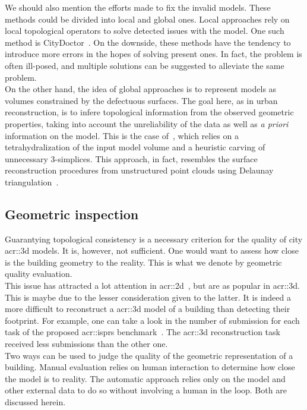         We should also mention the efforts made to fix the invalid models. 
        These methods could be divided into local and global ones.
        Local approaches rely on local topological operators to solve detected issues with the model.
        One such method is CityDoctor~\parencite{alam2014towards}.
        On the downside, these methods have the tendency to introduce more errors in the hopes of solving present ones.
        In fact, the problem is often ill-posed, and multiple solutions can be suggested to alleviate the same problem.\\
        On the other hand, the idea of global approaches is to represent models as volumes constrained by the defectuous surfaces.
        The goal here, as in urban reconstruction, is to infere topological information from the observed geometric properties, taking into account the unreliability of the data as well as \textit{a priori} information on the model.
        This is the case of~\textcite{zhao2013automatic}, which relies on a tetrahydralization of the input model volume and a heuristic carving of unnecessary 3-simplices.
        This approach, in fact, resembles the surface reconstruction procedures from unstructured point clouds using Delaunay triangulation~\parencite{cazals2006delaunay, berger2014state}.

    \subsection{Geometric inspection}
        \label{sec::introduction::building_model_evaluation::geometric}
        Guarantying topological consistency is a necessary criterion for the quality of city \gls{acr::3d} models.
        It is, however, not sufficient.
        One would want to assess how close is the building geometry to the reality.
        This is what we denote by geometric quality evaluation.\\
        This issue has attracted a lot attention in \gls{acr::2d}~\parencite{mooney2010towards}, but are as popular in \gls{acr::3d}.
        This is maybe due to the lesser consideration given to the latter.
        It is indeed a more difficult to reconstruct a \gls{acr::3d} model of a building than detecting their footprint.
        For example, one can take a look in the number of submission for each task of the proposed \gls{acr::isprs} benchmark~\textcite{rottensteiner2012isprs, rottensteiner2014results}.
        The \gls{acr::3d} reconstruction task received less submissions than the other one.\\
        Two ways can be used to judge the quality of the geometric representation of a building.
        Manual evaluation relies on human interaction to determine how close the model is to reality.
        The automatic approach relies only on the model and other external data to do so without involving a human in the loop.
        Both are discussed herein.

